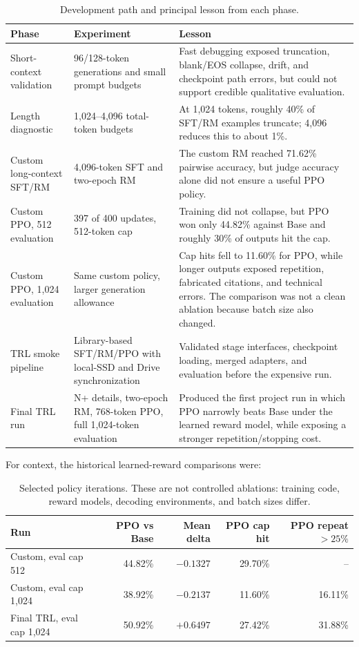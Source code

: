 \documentclass[11pt]{article}
\newcommand{\trl}{\textsc{TRL}}
\begin{document}
\begin{table}[H]
\centering
\small
\caption{Development path and principal lesson from each phase.}
\label{tab:history}
\begin{tabularx}{\textwidth}{@{}p{}p{}Y@{}}
\toprule
\textbf{Phase} & \textbf{Experiment} & \textbf{Lesson}\\
\midrule
Short-context validation &
96/128-token generations and small prompt budgets &
Fast debugging exposed truncation, blank/EOS collapse, drift, and checkpoint
path errors, but could not support credible qualitative evaluation.\\
Length diagnostic &
1,024--4,096 total-token budgets &
At 1,024 tokens, roughly 40\% of SFT/RM examples truncate; 4,096 reduces this
to about 1\%.\\
Custom long-context SFT/RM &
4,096-token SFT and two-epoch RM &
The custom RM reached 71.62\% pairwise accuracy, but judge accuracy alone did
not ensure a useful PPO policy.\\
Custom PPO, 512 evaluation &
397 of 400 updates, 512-token cap &
Training did not collapse, but PPO won only 44.82\% against Base and roughly
30\% of outputs hit the cap.\\
Custom PPO, 1,024 evaluation &
Same custom policy, larger generation allowance &
Cap hits fell to 11.60\% for PPO, while longer outputs exposed repetition,
fabricated citations, and technical errors. The comparison was not a clean
ablation because batch size also changed.\\
\trl{} smoke pipeline &
Library-based SFT/RM/PPO with local-SSD and Drive synchronization &
Validated stage interfaces, checkpoint loading, merged adapters, and
evaluation before the expensive run.\\
Final \trl{} run &
N+ details, two-epoch RM, 768-token PPO, full 1,024-token evaluation &
Produced the first project run in which PPO narrowly beats Base under the
learned reward model, while exposing a stronger repetition/stopping cost.\\
\bottomrule
\end{tabularx}
\end{table}

For context, the historical learned-reward comparisons were:

\begin{table}[H]
\centering
\caption{Selected policy iterations. These are not controlled ablations:
training code, reward models, decoding environments, and batch sizes differ.}
\label{tab:iteration-results}
\small
\begin{tabular}{@{}lrrrr@{}}
\toprule
\textbf{Run} &
\textbf{PPO vs Base} &
\textbf{Mean delta} &
\textbf{PPO cap hit} &
\textbf{PPO repeat $>25\%$}\\
\midrule
Custom, eval cap 512 & 44.82\% & $-0.1327$ & 29.70\% & --\\
Custom, eval cap 1,024 & 38.92\% & $-0.2137$ & 11.60\% & 16.11\%\\
Final \trl{}, eval cap 1,024 & 50.92\% & $+0.6497$ & 27.42\% & 31.88\%\\
\bottomrule
\end{tabular}
\end{table}
\end{document}
